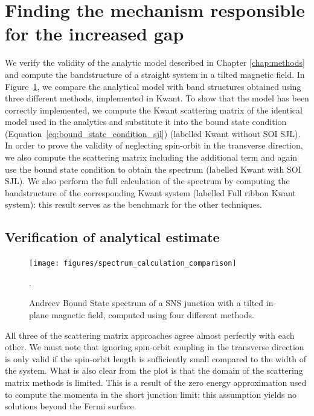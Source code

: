 	\section{Finding the mechanism responsible for the increased gap}
		We verify the validity of the analytic model described in Chapter \ref{chap:methods} and compute the bandstructure of a straight system in a tilted magnetic field.
		In Figure~\ref{fig:spectrum_calculation_comparison}, we compare the analytical model with band structures obtained using three different methods, implemented in Kwant.
		To show that the model has been correctly implemented, we compute the Kwant scattering matrix of the identical model used in the analytics and substitute it into the bound state condition (Equation~\eqref{eq:bound_state_condition_sjl}) (labelled Kwant without SOI SJL).
		In order to prove the validity of neglecting spin-orbit in the transverse direction, we also compute the scattering matrix including the additional term and again use the bound state condition to obtain the spectrum (labelled Kwant with SOI SJL).
		We also perform the full calculation of the spectrum by computing the bandstructure of the corresponding Kwant system (labelled Full ribbon Kwant system): this result serves as the benchmark for the other techniques.

		\subsection{Verification of analytical estimate}
			\begin{figure}[!htb]
			\centering
			\texttt{[image: figures/spectrum\_calculation\_comparison]}
			\caption{Andreev Bound State spectrum of a SNS junction with a tilted in-plane magnetic field, computed using four different methods.}.
			\label{fig:spectrum_calculation_comparison}
			\end{figure}

			All three of the scattering matrix approaches agree almost perfectly with each other.
			We must note that ignoring spin-orbit coupling in the transverse direction is only valid if the spin-orbit length is sufficiently small compared to the width of the system.
			What is also clear from the plot is that the domain of the scattering matrix methods is limited.
			This is a result of the zero energy approximation used to compute the momenta in the short junction limit: this assumption yields no solutions beyond the Fermi surface.

